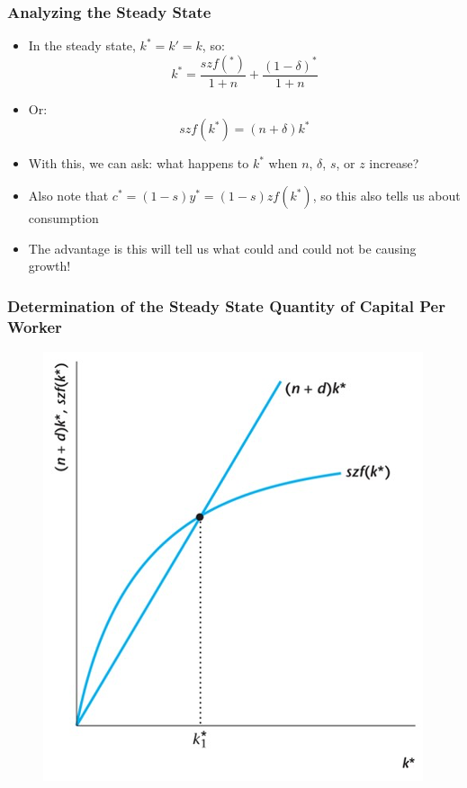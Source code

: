 \documentclass{beamer}
\begin{document}
\begin{frame}
\frametitle[alignment=center]{Analyzing the Steady State}
\begin{itemize}
\item In the steady state, $k^*=k'=k$, so:
$$k^*=\frac{szf(^*)}{1+n}+\frac{(1-\delta)^*}{1+n}$$
\item Or:
$$szf(k^*)=(n+\delta)k^*$$
\item With this, we can ask:  what happens to $k^*$ when $n$, $\delta$, $s$, or $z$ increase?
\bigskip
\item Also note that $c^*=(1-s)y^*=(1-s)zf(k^*)$, so this also tells us about consumption
\bigskip
\item The advantage is this will tell us what could and could not be causing growth!
\end{itemize}
\end{frame}



\begin{frame}
\frametitle[alignment=center]{Determination of the Steady State Quantity of Capital Per Worker}
\begin{figure}
\centering
\includegraphics[scale=0.5]{Figures/W_Fig_7pt14.png}
\end{figure}
\end{frame}
\end{document}
